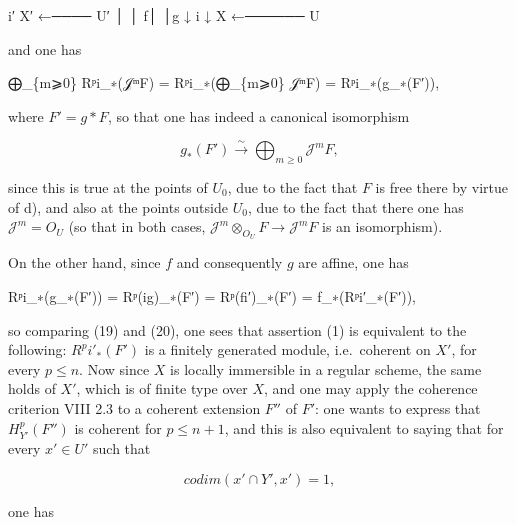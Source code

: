\documentclass[
]{article}
\newenvironment{Shaded}{}{}
\newcommand{\NormalTok}[1]{#1}
\begin{document}
\begin{Shaded}
\begin{Highlighting}[]
\NormalTok{       i′}
\NormalTok{X′ ←──── U′}
\NormalTok{│         │}
\NormalTok{f│         │g}
\NormalTok{↓    i    ↓}
\NormalTok{X ←────── U}
\end{Highlighting}
\end{Shaded}

and one has

\begin{Shaded}
\begin{Highlighting}[]
\NormalTok{⨁\_\{m⩾0\} Rᵖi\_∗(𝒥ᵐF) = Rᵖi\_∗(⨁\_\{m⩾0\} 𝒥ᵐF) = Rᵖi\_∗(g\_∗(F′)),}
\end{Highlighting}
\end{Shaded}

where \(F' = g*F\), so that one has indeed a canonical isomorphism

\[
g_{\ast}(F') \xrightarrow{\sim} \bigoplus_{m\geqslant 0} \mathcal{J}^{m}F,
\]

since this is true at the points of \(U_{0}\), due to the fact that
\(F\) is free there by virtue of d), and also at the points outside
\(U_{0}\), due to the fact that there one has
\(\mathcal{J}^{m} = O_{U}\) (so that in both cases,
\(\mathcal{J}^{m} \otimes_{O_{U}} F \to \mathcal{J}^{m}F\) is an
isomorphism).

On the other hand, since \(f\) and consequently \(g\) are affine, one
has

\begin{Shaded}
\begin{Highlighting}[]
\NormalTok{Rᵖi\_∗(g\_∗(F′)) = Rᵖ(ig)\_∗(F′) = Rᵖ(fi′)\_∗(F′) = f\_∗(Rᵖi′\_∗(F′)),}
\end{Highlighting}
\end{Shaded}

so comparing (19) and (20), one sees that assertion (1) is equivalent to
the following: \(R^{p}i'_{\ast}(F')\) is a finitely generated module,
i.e.~coherent on \(X'\), for every \(p \leqslant n\). Now since \(X\) is
locally immersible in a regular scheme, the same holds of \(X'\), which
is of finite type over \(X\), and one may apply the coherence criterion
VIII 2.3 to a coherent extension \(F''\) of \(F'\): one wants to express
that \(H^{p}_{Y'}(F'')\) is coherent for \(p \leqslant n + 1\), and this
is also equivalent to saying that for every \(x' \in U'\) such that

\[
codim({x'} \cap Y', {x'}) = 1,
\]

one has
\end{document}
